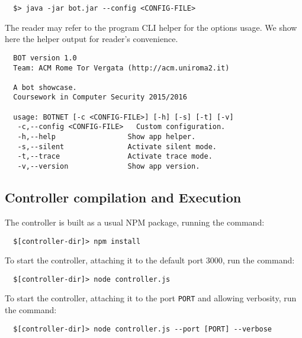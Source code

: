 \begin{verbatim}
  $> java -jar bot.jar --config <CONFIG-FILE>
\end{verbatim}

The reader may refer to the program CLI helper for the options usage. We show here the helper output for reader's convenience.

\begin{verbatim}
  BOT version 1.0
  Team: ACM Rome Tor Vergata (http://acm.uniroma2.it)

  A bot showcase.
  Coursework in Computer Security 2015/2016

  usage: BOTNET [-c <CONFIG-FILE>] [-h] [-s] [-t] [-v]
   -c,--config <CONFIG-FILE>   Custom configuration.
   -h,--help                 Show app helper.
   -s,--silent               Activate silent mode.
   -t,--trace                Activate trace mode.
   -v,--version              Show app version.
\end{verbatim}

\subsection{Controller compilation and Execution}
\label{sec:controller-compilation-execution}

The controller is built as a usual NPM package, running the command:

\begin{verbatim}
  $[controller-dir]> npm install
\end{verbatim}

To start the controller, attaching it to the default port 3000, run the command:

\begin{verbatim}
  $[controller-dir]> node controller.js
\end{verbatim}

To start the controller, attaching it to the port \texttt{PORT} and allowing verbosity, run the command:

\begin{verbatim}
  $[controller-dir]> node controller.js --port [PORT] --verbose
\end{verbatim}
